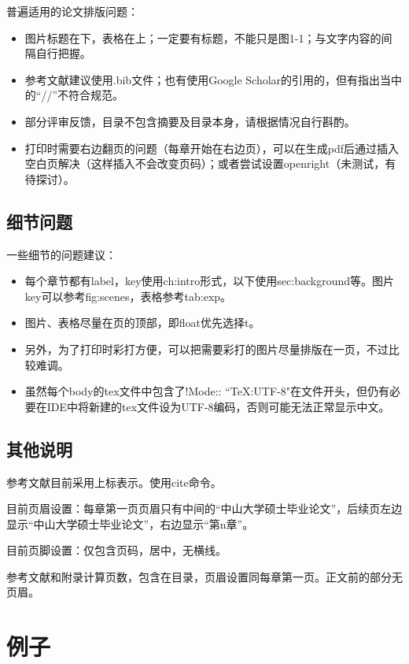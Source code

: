 普遍适用的论文排版问题：

\begin{itemize}
\item 图片标题在下，表格在上；一定要有标题，不能只是图1-1；与文字内容的间隔自行把握。
\item 参考文献建议使用.bib文件；也有使用Google Scholar的引用的，但有指出当中的“//”不符合规范。
\item 部分评审反馈，目录不包含摘要及目录本身，请根据情况自行斟酌。
\item 打印时需要右边翻页的问题（每章开始在右边页），可以在生成pdf后通过插入空白页解决（这样插入不会改变页码）；或者尝试设置openright（未测试，有待探讨）。
\end{itemize}

\subsection{细节问题}
\label{subsec:specs}

一些细节的问题建议：
\begin{itemize}
\item 每个章节都有label，key使用ch:intro形式，以下使用sec:background等。图片key可以参考fig:scenes，表格参考tab:exp。
\item 图片、表格尽量在页的顶部，即float优先选择t。
\item 另外，为了打印时彩打方便，可以把需要彩打的图片尽量排版在一页，不过比较难调。
\item 虽然每个body的tex文件中包含了!Mode:: ``TeX:UTF-8"在文件开头，但仍有必要在IDE中将新建的tex文件设为UTF-8编码，否则可能无法正常显示中文。
\end{itemize}

\subsection{其他说明}
\label{sec:setting}

参考文献目前采用上标表示。使用cite命令。

目前页眉设置：每章第一页页眉只有中间的“中山大学硕士毕业论文”，后续页左边显示“中山大学硕士毕业论文”，右边显示“第n章”。

目前页脚设置：仅包含页码，居中，无横线。

参考文献和附录计算页数，包含在目录，页眉设置同每章第一页。正文前的部分无页眉。

\section{例子}
\label{sec:examples}


